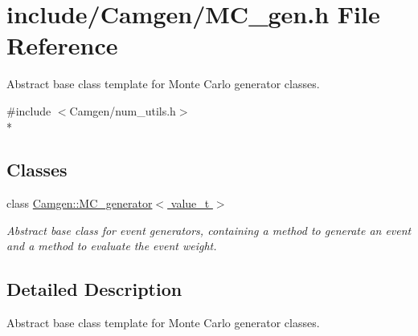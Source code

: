 \hypertarget{a00691}{}\section{include/\+Camgen/\+M\+C\+\_\+gen.h File Reference}
\label{a00691}


Abstract base class template for Monte Carlo generator classes.  


{\ttfamily \#include $<$Camgen/num\+\_\+utils.\+h$>$}\\*
\subsection*{Classes}
\begin{DoxyCompactItemize}
\item 
class \hyperlink{a00366}{Camgen\+::\+M\+C\+\_\+generator$<$ value\+\_\+t $>$}
\begin{DoxyCompactList}\small\item\em Abstract base class for event generators, containing a method to generate an event and a method to evaluate the event weight. \end{DoxyCompactList}\end{DoxyCompactItemize}


\subsection{Detailed Description}
Abstract base class template for Monte Carlo generator classes. 

